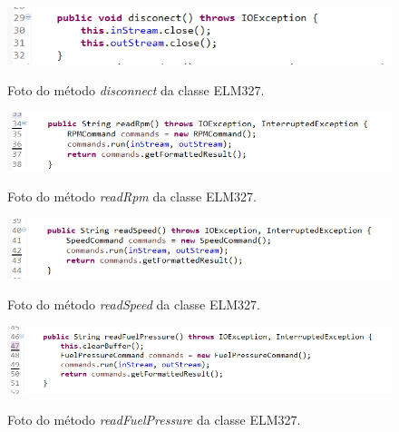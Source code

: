 \begin{figure}[!ht]
\centering
\caption{Foto do método \textit{disconnect} da classe ELM327.} 
{\includegraphics[scale=.70]{imagens/pacoteScanner-ELM327_disconnect.png}}\\
 \label{Fig:elm327_disconnect}
\end{figure}

\begin{figure}[!ht]
\centering
\caption{Foto do método \textit{readRpm} da classe ELM327.} 
{\includegraphics[scale=.85]{imagens/pacoteScanner-ELM327_readRpm.png}}\\
 \label{Fig:elm327_read_rpm}
\end{figure}

\begin{figure}[!ht]
\centering
\caption{Foto do método \textit{readSpeed} da classe ELM327.} 
{\includegraphics[scale=.85]{imagens/pacoteScanner-ELM327_readSpeed.png}}\\
 \label{Fig:elm327_read_speed}
\end{figure}

\begin{figure}[!ht]
\centering
\caption{Foto do método \textit{readFuelPressure} da classe ELM327.} 
{\includegraphics[scale=.80]{imagens/pacoteScanner-ELM327_readFuelPressure.png}}\\
 \label{Fig:elm327_read_fuel_pressure}
\end{figure}

